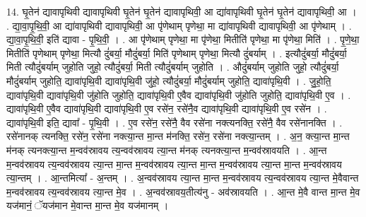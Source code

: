 \documentclass[17pt]{extarticle}
\begin{document}
14. घृ॒तेन॑ द्यावापृथिवी द्यावापृथिवी घृ॒तेन॑ घृ॒तेन॑ द्यावापृथिवी॒ आ द्या॑वापृथिवी घृ॒तेन॑ घृ॒तेन॑ द्यावापृथिवी॒ आ । . द्या॒वा॒पृ॒थि॒वी॒ आ द्या॑वापृथिवी द्यावापृथिवी॒ आ पृ॑णेथाम् पृणेथा॒ मा द्या॑वापृथिवी द्यावापृथिवी॒ आ पृ॑णेथाम् । . द्या॒वा॒पृ॒थि॒वी॒ इति॑ द्यावा - पृ॒थि॒वी॒ । . आ पृ॑णेथाम् पृणेथा॒ मा पृ॑णेथा॒ मितीति॑ पृणेथा॒ मा पृ॑णेथा॒ मिति॑ । . पृ॒णे॒था॒ मितीति॑ पृणेथाम् पृणेथा॒ मित्यौ दुं॑बर्या॒ मौदुं॑बर्या॒ मिति॑ पृणेथाम् पृणेथा॒ मित्यौ दुं॑बर्याम् । . इत्यौदुं॑बर्या॒ मौदुं॑बर्या॒ मिती त्यौदुं॑बर्याम् जुहोति जुहो॒ त्यौदुं॑बर्या॒ मिती त्यौदुं॑बर्याम् जुहोति । . औदुं॑बर्याम् जुहोति जुहो॒ त्यौदुं॑बर्या॒ मौदुं॑बर्याम् जुहोति॒ द्यावा॑पृथि॒वी द्यावा॑पृथि॒वी जु॑हो॒
त्यौदुं॑बर्या॒ मौदुं॑बर्याम् जुहोति॒ द्यावा॑पृथि॒वी । . जु॒हो॒ति॒ द्यावा॑पृथि॒वी द्यावा॑पृथि॒वी जु॑होति जुहोति॒ द्यावा॑पृथि॒वी ए॒वैव द्यावा॑पृथि॒वी जु॑होति जुहोति॒ द्यावा॑पृथि॒वी ए॒व । . द्यावा॑पृथि॒वी ए॒वैव द्यावा॑पृथि॒वी द्यावा॑पृथि॒वी ए॒व रसे॑न॒ रसे॑नै॒व द्यावा॑पृथि॒वी द्यावा॑पृथि॒वी ए॒व रसे॑न । . द्यावा॑पृथि॒वी इति॒ द्यावा᳚ - पृ॒थि॒वी । . ए॒व रसे॑न॒ रसे॑नै॒ वैव रसे॑ना नक्त्यनक्ति॒ रसे॑नै॒ वैव रसे॑नानक्ति । . रसे॑नानक् त्यनक्ति॒ रसे॑न॒ रसे॑ना नक्त्या॒न्त मा॒न्त म॑नक्ति॒ रसे॑न॒ रसे॑ना नक्त्या॒न्तम् । . अ॒न॒ क्त्या॒न्त मा॒न्त म॑नक् त्यनक्त्या॒न्त म॒न्वव॑स्रावय त्य॒न्वव॑स्रावय त्या॒न्त म॑नक् त्यनक्त्या॒न्त म॒न्वव॑स्रावयति । . आ॒न्त म॒न्वव॑स्रावय त्य॒न्वव॑स्रावय त्या॒न्त मा॒न्त म॒न्वव॑स्रावय त्या॒न्त मा॒न्त म॒न्वव॑स्रावय त्या॒न्त मा॒न्त म॒न्वव॑स्रावय त्या॒न्तम् । . आ॒न्तमित्या᳚ - अ॒न्तम् । . अ॒न्वव॑स्रावय त्या॒न्त मा॒न्त म॒न्वव॑स्रावय त्य॒न्वव॑स्रावय त्या॒न्त मे॒वैवान्त म॒न्वव॑स्रावय त्य॒न्वव॑स्रावय त्या॒न्त मे॒व । . अ॒न्वव॑स्रावय॒तीत्य॑नु - अव॑स्रावयति । . आ॒न्त मे॒वै वान्त मा॒न्त मे॒व यज॑मानं॒ ॅयज॑मान मे॒वान्त मा॒न्त मे॒व यज॑मानम् । \newline
\end{document}
